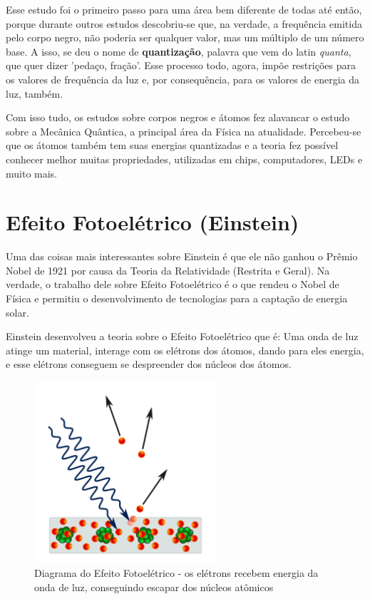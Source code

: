 \documentclass[12pt]{extarticle}
\newcommand{\<}{\langle}
\renewcommand{\>}{\rangle}
\theoremstyle{definition}
\begin{document}
Esse estudo foi o primeiro passo para uma área bem diferente de todas até então, porque durante outros estudos descobriu-se que, na verdade, a frequência emitida pelo corpo negro, não poderia ser qualquer valor, mas um múltiplo de um número base. A isso, se deu o nome de \textbf{quantização}, palavra que vem do latin \textit{quanta}, que quer dizer 'pedaço, fração'. Esse processo todo, agora, impõe restrições para os valores de frequência da luz e, por consequência, para os valores de energia da luz, também.  

Com isso tudo, os estudos sobre corpos negros e átomos fez alavancar o estudo sobre a Mecânica Quântica, a principal área da Física na atualidade. Percebeu-se que os átomos também tem suas energias quantizadas e a teoria fez possível conhecer melhor muitas propriedades, utilizadas em chips, computadores, LEDs e muito mais.

\section{Efeito Fotoelétrico (Einstein)}
Uma das coisas mais interessantes sobre Einstein é que ele não ganhou o Prêmio Nobel de 1921 por causa da Teoria da Relatividade (Restrita e Geral). Na verdade, o trabalho dele sobre Efeito Fotoelétrico é o que rendeu o Nobel de Física e permitiu o desenvolvimento de tecnologias para a captação de energia solar.

Einstein desenvolveu a teoria sobre o Efeito Fotoelétrico que é: Uma onda de luz atinge um material, interage com os elétrons dos átomos, dando para eles energia, e esse elétrons conseguem se despreender dos núcleos dos átomos.

\begin{figure}[H]
    \centering
    \includegraphics[width=0.6\textwidth]{1200px-Photoelectric_effect_in_a_solid_-_diagram.svg.png}
    \caption{Diagrama do Efeito Fotoelétrico - os elétrons recebem energia da onda de luz, conseguindo escapar dos núcleos atômicos}
    \label{fig:photoelectric}
\end{figure}
\end{document}
